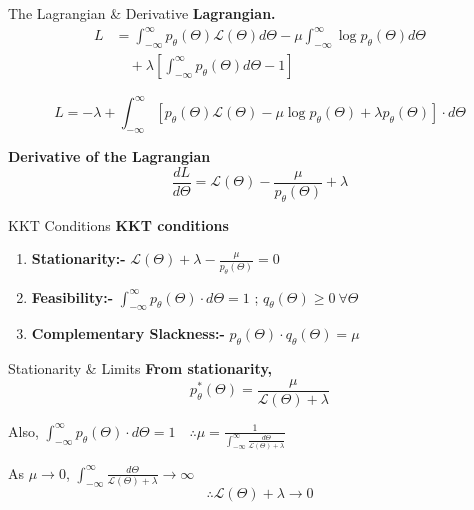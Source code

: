 \documentclass{beamer}
\begin{document}
\begin{frame}{The Lagrangian \& Derivative}
    \textbf{Lagrangian.}
    \begin{align*}
        L &= \int_{-\infty}^{\infty} p_{\theta}(\Theta)\mathcal{L}(\Theta)d\Theta - \mu \int_{-\infty}^{\infty} \log p_{\theta}(\Theta)d\Theta \\
        &\quad + \lambda \left[ \int_{-\infty}^{\infty} p_{\theta}(\Theta)d\Theta - 1 \right]
    \end{align*}
    
    \[
        L = -\lambda + \int_{-\infty}^{\infty} \left[ p_{\theta}(\Theta)\mathcal{L}(\Theta) - \mu \log p_{\theta}(\Theta) + \lambda p_{\theta}(\Theta) \right] \cdot d\Theta
    \]
    
    \vspace{0.5cm}
    \textbf{Derivative of the Lagrangian}
    \[
        \frac{dL}{d\Theta} = \mathcal{L}(\Theta) - \frac{\mu}{p_{\theta}(\Theta)} + \lambda
    \]
\end{frame}

\begin{frame}{KKT Conditions}
    \textbf{KKT conditions}
    \begin{enumerate}
        \item \textbf{Stationarity:-} $\mathcal{L}(\Theta) + \lambda - \frac{\mu}{p_{\theta}(\Theta)} = 0$
        \vspace{0.2cm}
        \item \textbf{Feasibility:-} $\int_{-\infty}^{\infty} p_{\theta}(\Theta) \cdot d\Theta = 1$ ; $q_{\theta}(\Theta) \geq 0 \ \forall \Theta$
        \vspace{0.2cm}
        \item \textbf{Complementary Slackness:-} $p_{\theta}(\Theta) \cdot q_{\theta}(\Theta) = \mu$
    \end{enumerate}
\end{frame}

\begin{frame}{Stationarity \& Limits}
    \textbf{From stationarity,}
    \[
        p_{\theta}^*(\Theta) = \frac{\mu}{\mathcal{L}(\Theta) + \lambda}
    \]
    
    Also, $\int_{-\infty}^{\infty} p_{\theta}(\Theta) \cdot d\Theta = 1 \quad \therefore \mu = \frac{1}{\int_{-\infty}^{\infty} \frac{d\Theta}{\mathcal{L}(\Theta) + \lambda}}$
    
    \vspace{0.5cm}
    As $\mu \rightarrow 0$, $\int_{-\infty}^{\infty} \frac{d\Theta}{\mathcal{L}(\Theta) + \lambda} \rightarrow \infty$
    \[
        \therefore \mathcal{L}(\Theta) + \lambda \rightarrow 0
    \]
    
    \vspace{0.2cm}
    \begin{center}
         
    \end{center}
\end{frame}
\end{document}
